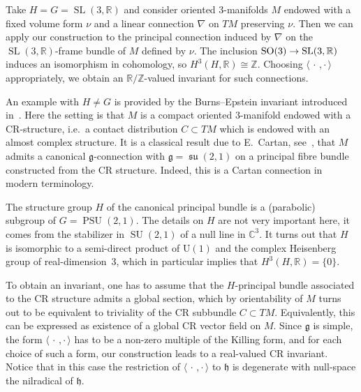 \documentclass[AHL,Unicode,longabstracts]{cedram}
\newcommand{\B}[2]{\langle#1,#2\rangle}
\DeclareMathOperator{\SO}{SO}
\DeclareMathOperator{\SL}{SL}
\DeclareMathOperator{\SU}{SU}
\DeclareMathOperator{\PSU}{PSU}
\DeclareMathOperator{\fksu}{\mathfrak{su}}
\newcommand{\rmU}{\mathrm{U}}
\newcommand*{\R}{\mathbb{R}}
\newcommand{\Z}{\mathbb{Z}}
\newcommand{\bbC}{\mathbb{C}}
\newcommand{\fkg}{\mathfrak{g}}
\newcommand{\fkh}{\mathfrak{h}}
\renewcommand*{\to}{\mathchoice{\longrightarrow}{\rightarrow}{\rightarrow}{\rightarrow}}
\newcommand*{\R}{\mathbb{R}}
\begin{document}
\begin{exam}\label{exam4.3}
Take $H=G=\SL(3,\R)$ and consider oriented $3$-manifolds $M$ endowed with a fixed volume form $\nu$ and a linear connection $\nabla$ on $TM$ preserving $\nu$. Then we can apply our construction to the principal connection induced by $\nabla$ on the $\SL(3,\R)$-frame bundle of $M$ defined by $\nu$. The inclusion $\SO(3)\to \SL(3,\R)$ induces an isomorphism in cohomology, so $H^3(H,\R)\cong\Z$. Choosing $\B{\,\cdot\,}{\cdot\,}$ appropriately, we obtain an $\R/\Z$-valued invariant for such connections.
\end{exam}

\begin{exam}\label{exam4.4}
An example with $H\neq G$ is provided by the Burns--Epstein invariant introduced in~\cite{MR0936085}. Here the setting is that $M$ is a compact oriented $3$-manifold endowed with a CR-structure, i.e.\ a contact distribution $C\subset TM$ which is endowed with an almost complex structure. It is a classical result due to E.~Cartan, see~\cite{MR1556687}, that $M$ admits a canonical $\fkg$-connection with $\fkg=\fksu(2,1)$ on a principal fibre bundle constructed from the CR structure. Indeed, this is a Cartan connection in modern terminology.

The structure group $H$ of the canonical principal bundle is a (parabolic) subgroup of $G=\PSU(2,1)$. The details on $H$ are not very important here, it comes from the stabilizer in $\SU(2,1)$ of a null line in $\bbC^3$. It turns out that $H$ is isomorphic to a semi-direct product of $\rmU(1)$ and the complex Heisenberg group of real-dimension~$3$, which in particular implies that $H^3(H,\R)=\{0\}$.

To obtain an invariant, one has to assume that the $H$-principal bundle associated to the CR structure admits a global section, which by orientability of $M$ turns out to be equivalent to triviality of the CR subbundle $C\subset TM$. Equivalently, this can be expressed as existence of a global CR vector field on $M$. Since $\fkg$ is simple, the form $\B{\,\cdot\,}{\cdot\,}$ has to be a non-zero multiple of the Killing form, and for each choice of such a form, our construction leads to a real-valued CR invariant. Notice that in this case the restriction of $\B{\,\cdot\,}{\cdot\,}$ to $\fkh$ is degenerate with null-space the nilradical of $\fkh$.
\end{exam}
\end{document}

